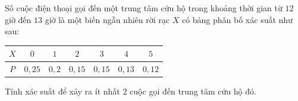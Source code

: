 \begin{ex}
Số cuộc điện thoại gọi đến một trung tâm cứu hộ trong khoảng thời gian từ $12$ giờ đến $13$ giờ là một biến ngẫu nhiên rời rạc $X$ có bảng phân bố xác suất như sau:
\begin{center}
\begin{tabular}{|c|c|c|c|c|c|c|}\hline
$X$ & $0$ & $1$ & $2$ & $3$ & $4$ & $5$\\\hline
$P$ & $0{,}25$ & $0{,}2$ & $0{,}15$ & $0{,}15$ & $0{,}13$ & $0{,}12$\\\hline
\end{tabular}
\end{center}
Tính xác suất để xảy ra ít nhất $2$ cuộc gọi đến trung tâm cứu hộ đó.
\end{ex}
